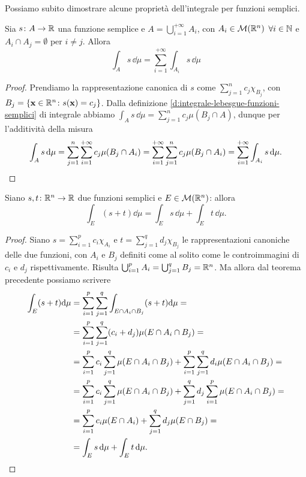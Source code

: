 Possiamo subito dimostrare alcune proprietà dell'integrale per funzioni semplici.
\begin{teorema} \label{t:integrale-funzioni-semplici-additivita-numerabile-insieme}
	Sia $s\colon A\to\mathbb{R}$ una funzione semplice e $A=\bigcup_{i=1}^{+\infty}A_i$, con $A_i\in\mathcal M(\mathbb{R}^n)$ $\forall i\in\mathbb{N}$ e $A_i\cap A_j=\emptyset$ per $i\neq j$.
	Allora
	\begin{equation}
		\int_As\,\dd\mu=\sum_{i=1}^{+\infty}\int_{A_i}s\,\dd\mu
		\label{eq:integrale-funzioni-semplici-additivita-numerabile-insieme}
	\end{equation}
\end{teorema}
\begin{proof}
	Prendiamo la rappresentazione canonica di $s$ come $\sum_{j=1}^nc_j\chi_{B_j}$, con $B_j=\{\mathbf{x}\in\mathbb{R}^n\colon s(\mathbf{x})=c_j\}$.
	Dalla definizione \ref{d:integrale-lebesgue-funzioni-semplici} di integrale abbiamo $\int_As\,\dd\mu=\sum_{j=1}^nc_j\mu(B_j\cap A)$, dunque per l'additività della misura
	\begin{equation}
		\int_As\,\textup{d}\mu=\sum_{j=1}^n\sum_{i=1}^{+\infty}c_j\mu(B_j\cap A_i)=\sum_{i=1}^{+\infty}\sum_{j=1}^nc_j\mu(B_j\cap A_i)=\sum_{i=1}^{+\infty}\int_{A_i}s\,\textup{d}\mu.\qedhere
	\end{equation}
\end{proof}
\begin{teorema} \label{t:integrale-funzioni-semplici-linearita}
	Siano $s,t\colon\mathbb{R}^n\to\mathbb{R}$ due funzioni semplici e $E\in\mathcal M(\mathbb{R}^n)$: allora
	\begin{equation}
		\int_E(s+t)\dd\mu=\int_Es\,\dd\mu+\int_Et\,\dd\mu.
		\label{eq:integrale-funzioni-semplici-linearita}
	\end{equation}
\end{teorema}
\begin{proof}
	Siano $s=\sum_{i=1}^pc_i\chi_{A_i}$ e $t=\sum_{j=1}^qd_j\chi_{B_j}$ le rappresentazioni canoniche delle due funzioni, con $A_i$ e $B_j$ definiti come al solito come le controimmagini di $c_i$ e $d_j$ rispettivamente.
	Risulta $\bigcup_{i=1}^pA_i=\bigcup_{j=1}^{q}B_j=\mathbb{R}^n$.
	Ma allora dal teorema precedente possiamo scrivere
	\begin{equation}
		\begin{split}
			\int_E(s+t)\textup{d}\mu&=\sum_{i=1}^p\sum_{j=1}^q\int_{E\cap A_i\cap B_j}(s+t)\textup{d}\mu=\\
			&=\sum_{i=1}^p\sum_{j=1}^q(c_i+d_j)\mu(E\cap A_i\cap B_j)=\\
			&=\sum_{i=1}^pc_i\sum_{j=1}^q\mu(E\cap A_i\cap B_j)+\sum_{i=1}^p\sum_{j=1}^qd_i\mu(E\cap A_i\cap B_j)=\\
			&=\sum_{i=1}^pc_i\sum_{j=1}^q\mu(E\cap A_i\cap B_j)+\sum_{j=1}^qd_j\sum_{i=1}^p\mu(E\cap A_i\cap B_j)=\\
			&=\sum_{i=1}^pc_i\mu(E\cap A_i)+\sum_{j=1}^qd_j\mu(E\cap B_j)=\\
			&=\int_Es\,\textup{d}\mu+\int_Et\,\textup{d}\mu.\qedhere
		\end{split}
	\end{equation}
\end{proof}

